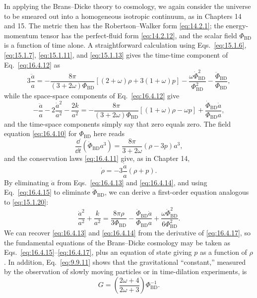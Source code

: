 In applying the Brans--Dicke theory to cosmology, we again consider the
universe to be smeared out into a homogeneous isotropic continuum, as in
Chapters 14 and 15. The metric then has the Robertson--Walker form
\eqref{eq:14.2.1}; the energy-momentum tensor has the perfect-fluid form
\eqref{eq:14.2.12}, and the scalar field \(\Phi_{\mathrm{BD}}\) is a function
of time alone. A straightforward calculation using Eqs.~\eqref{eq:15.1.6},
\eqref{eq:15.1.7}, \eqref{eq:15.1.11}, and \eqref{eq:15.1.13} gives the
time-time component of Eq.~\eqref{eq:16.4.12} as
\begin{equation}
  3\frac{\ddot a}{a}
  =
  -\frac{8\pi}{(3+2\omega)\Phi_{\mathrm{BD}}}
   \left[(2+\omega)\rho+3(1+\omega)p\right]
  -\frac{\omega\dot\Phi_{\mathrm{BD}}^2}{\Phi_{\mathrm{BD}}^2}
  -\frac{\ddot\Phi_{\mathrm{BD}}}{\Phi_{\mathrm{BD}}},
  \tag{16.4.13}\label{eq:16.4.13}
\end{equation}
while the space-space components of Eq.~\eqref{eq:16.4.12} give
\begin{equation}
  -\frac{\ddot a}{a}
  -2\frac{\dot a^2}{a^2}
  -\frac{2k}{a^2}
  =
  -\frac{8\pi}{(3+2\omega)\Phi_{\mathrm{BD}}}
   \left[(1+\omega)\rho-\omega p\right]
  +\frac{\dot\Phi_{\mathrm{BD}}\dot a}{\Phi_{\mathrm{BD}}a},
  \tag{16.4.14}\label{eq:16.4.14}
\end{equation}
and the time-space components simply say that zero equals zero. The field
equation \eqref{eq:16.4.10} for \(\Phi_{\mathrm{BD}}\) here reads
\begin{equation}
  \frac{\dd}{\dd t}
  \left(\dot\Phi_{\mathrm{BD}}a^3\right)
  =
  \frac{8\pi}{3+2\omega}(\rho-3p)a^3,
  \tag{16.4.15}\label{eq:16.4.15}
\end{equation}
and the conservation laws \eqref{eq:16.4.11} give, as in Chapter 14,
\begin{equation}
  \dot\rho=-3\frac{\dot a}{a}(\rho+p).
  \tag{16.4.16}\label{eq:16.4.16}
\end{equation}
By eliminating \(\ddot a\) from Eqs.~\eqref{eq:16.4.13} and
\eqref{eq:16.4.14}, and using Eq.~\eqref{eq:16.4.15} to eliminate
\(\ddot\Phi_{\mathrm{BD}}\), we can derive a first-order equation analogous to
\eqref{eq:15.1.20}:
\begin{equation}
  \frac{\dot a^2}{a^2}
  +\frac{k}{a^2}
  =
  \frac{8\pi\rho}{3\Phi_{\mathrm{BD}}}
  -\frac{\dot\Phi_{\mathrm{BD}}\dot a}{\Phi_{\mathrm{BD}}a}
  +\frac{\omega\dot\Phi_{\mathrm{BD}}^2}
        {6\Phi_{\mathrm{BD}}^2}.
  \tag{16.4.17}\label{eq:16.4.17}
\end{equation}
We can recover \eqref{eq:16.4.13} and \eqref{eq:16.4.14} from the derivative
of \eqref{eq:16.4.17}, so the fundamental equations of the Brans--Dicke
cosmology may be taken as Eqs.~\eqref{eq:16.4.15}--\eqref{eq:16.4.17}, plus
an equation of state giving \(p\) as a function of \(\rho\). In addition,
Eq.~\eqref{eq:9.9.11} shows that the gravitational ``constant,'' measured by
the observation of slowly moving particles or in time-dilation experiments, is
\begin{equation}
  G
  =
  \left(\frac{2\omega+4}{2\omega+3}\right)
  \Phi_{\mathrm{BD}}^{-1}.
  \tag{16.4.18}\label{eq:16.4.18}
\end{equation}

